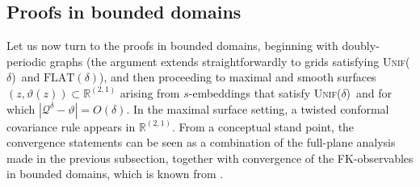 \documentclass[reqno]{amsart}
\numberwithin{equation}{section}
\theoremstyle{definition}
\theoremstyle{remark}
\newcommand\cQ{\mathcal{Q}}
\newcommand\Unif{{\mbox{\textsc{Unif(}$\delta$\textsc{)}}}}
\begin{document}
\subsection{Proofs in bounded domains}


Let us now turn to the proofs in bounded domains, beginning with doubly-periodic graphs (the argument extends straightforwardly to grids satisfying \Unif\, and $\textrm{FLAT}(\delta)$), and then proceeding to maximal and smooth surfaces $(z,\vartheta(z)) \subset \mathbb{R}^{(2,1)}$ arising from $s$-embeddings that satisfy \Unif\, and for which $|\cQ^\delta - \vartheta| = O(\delta)$. In the maximal surface setting, a twisted conformal covariance rule appears in $\mathbb{R}^{(2,1)}$.  From a conceptual stand point, the convergence statements can be seen as a combination of the full-plane analysis made in the previous subsection, together with convergence of the FK-observables in bounded domains, which is known from \cite{Che20,Par25,MahPHD}.
\end{document}
